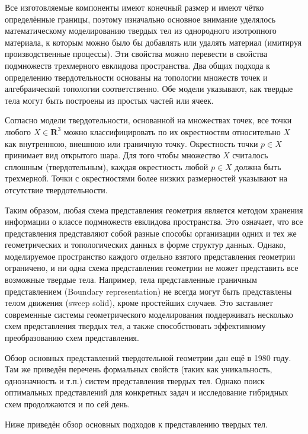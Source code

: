 Все изготовляемые компоненты имеют конечный размер и имеют чётко определённые границы, поэтому изначально основное внимание уделялось математическому моделированию твердых тел из однородного изотропного материала, к которым можно было бы добавлять или удалять материал (имитируя производственные процессы). Эти свойства можно перевести в свойства подмножеств трехмерного евклидова пространства. Два общих подхода к определению твердотельности основаны на топологии множеств точек и алгебраической топологии соответственно. Обе модели указывают, как твердые тела могут быть построены из простых частей или ячеек.

Согласно модели твердотельности, основанной на множествах точек, все точки любого $X \in \mathbf{R}^3$ можно классифицировать по их окрестностям относительно $X$ как внутреннюю, внешнюю или граничную точку. Окрестность точки $p \in X$ принимает вид открытого шара. Для того чтобы множество $X$ считалось сплошным (твердотельным), каждая окрестность любой $p \in X$ должна быть трехмерной. Точки с окрестностями более низких размерностей указывают на отсутствие твердотельности.


Таким образом, любая схема представления геометрия является методом хранения информации о классе  подмножеств евклидова пространства. Это означает, что все представления представляют собой разные способы организации одних и тех же геометрических и топологических данных в форме структур данных. Однако, моделируемое пространство каждого отдельно взятого представления геометрии ограничено, и ни одна схема представления геометрии не может представить все возможные твердые тела. Например, тела представленные граничным представлением (Boundary representation) не всегда могут быть представлены телом движения (sweep solid), кроме простейших случаев. Это заставляет современные системы геометрического моделирования поддерживать несколько схем представления твердых тел, а также способствовать эффективному преобразованию схем представления.

Обзор основных представлений твердотельной геометрии дан \cite{Requicha80} ещё в 1980 году. Там же приведён перечень формальных свойств (таких как уникальность, однозначность и т.п.) систем представления твердых тел. Однако поиск оптимальных представлений для конкретных задач и исследование гибридных схем продолжаются и по сей день.

Ниже приведён обзор основных подходов к представлению твердых тел.

